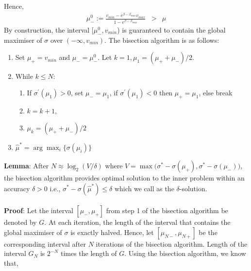 Hence,
\begin{eqnarray*}
\mu_{-}^0 := \frac{v_{min} - e^{\beta - \beta_{max}}v_{max}}{1 - e^{\beta - \beta_{max}}} &>& \mu
\end{eqnarray*}
By construction, the interval [$\mu_-^0, v_{min}$) is guaranteed to contain the global maximiser of $\sigma$ over $(-\infty, v_{min})$. The bisection algorithm is as follows:
\begin{enumerate}
	\item Set $\mu_+ = v_{min}$ and $\mu_- = \mu_-^0$. Let $k=1, \mu_1 = (\mu_+ + \mu_-)/2$.
	\item While $k \leq N$:
	\begin{enumerate}
		\item If $\sigma^{'}(\mu_1) > 0$, set $\mu_- = \mu_1$, if $\sigma^{'}(\mu_1) < 0$ then $\mu_+ = \mu_1$, else break
		\item $k = k + 1$, 
		\item $\mu_{k} = (\mu_+ + \mu_-)/2$
	\end{enumerate}
	\item $\hat{\mu}^* = \arg \max_{i} \{\sigma(\mu_i)\}$
\end{enumerate}
\textbf{Lemma}: After $N \approx \log_2(V/\delta)$ where $V = \max\big(\sigma^* - \sigma(\mu_+), \sigma^* - \sigma(\mu_-)\big)$, the bisection algorithm provides optimal solution to the inner problem within an accuracy $\delta > 0$ i.e., $\sigma^* - \sigma(\hat{\mu}^*) \leq \delta$ which we call as the $\delta$-solution. \\ \\
\textbf{Proof}: Let the interval $[\mu_-,\mu_+]$ from step 1 of the bisection algorithm be denoted by $G$. At each iteration, the length of the interval that contains the global maximiser of $\sigma$ is exactly halved. Hence, let $[\mu_{N-}, \mu_{N+}]$ be the corresponding interval after $N$ iterations of the bisection algorithm. Length of the interval $G_N$ is $2^{-N}$ times the length of $G$. Using the bisection algorithm, we know that,
